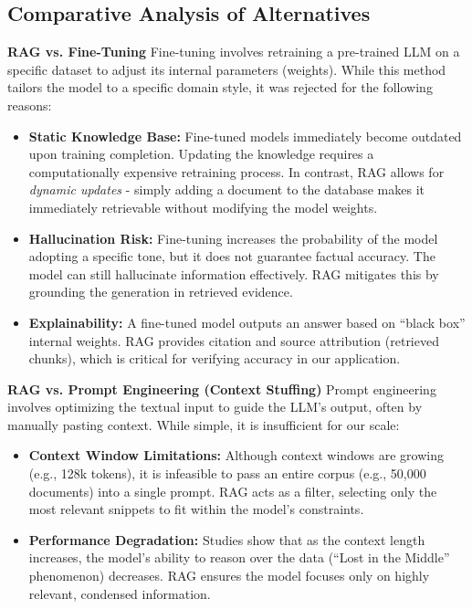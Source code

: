 \subsection{Comparative Analysis of Alternatives}

\textbf{RAG vs. Fine-Tuning}
Fine-tuning involves retraining a pre-trained LLM on a specific dataset to adjust its internal parameters (weights). While this method tailors the model to a specific domain style, it was rejected for the following reasons:

\begin{itemize}
    \item \textbf{Static Knowledge Base:} Fine-tuned models immediately become outdated upon training completion. Updating the knowledge requires a computationally expensive retraining process. In contrast, RAG allows for \textit{dynamic updates} - simply adding a document to the database makes it immediately retrievable without modifying the model weights.
    \item \textbf{Hallucination Risk:} Fine-tuning increases the probability of the model adopting a specific tone, but it does not guarantee factual accuracy. The model can still hallucinate information effectively. RAG mitigates this by grounding the generation in retrieved evidence.
    \item \textbf{Explainability:} A fine-tuned model outputs an answer based on ``black box'' internal weights. RAG provides citation and source attribution (retrieved chunks), which is critical for verifying accuracy in our application.
\end{itemize}

\textbf{RAG vs. Prompt Engineering (Context Stuffing)}
Prompt engineering involves optimizing the textual input to guide the LLM's output, often by manually pasting context. While simple, it is insufficient for our scale:

\begin{itemize}
    \item \textbf{Context Window Limitations:} Although context windows are growing (e.g., 128k tokens), it is infeasible to pass an entire corpus (e.g., 50,000 documents) into a single prompt. RAG acts as a filter, selecting only the most relevant snippets to fit within the model's constraints.
    \item \textbf{Performance Degradation:} Studies show that as the context length increases, the model's ability to reason over the data (``Lost in the Middle'' phenomenon) decreases. RAG ensures the model focuses only on highly relevant, condensed information.
\end{itemize}

